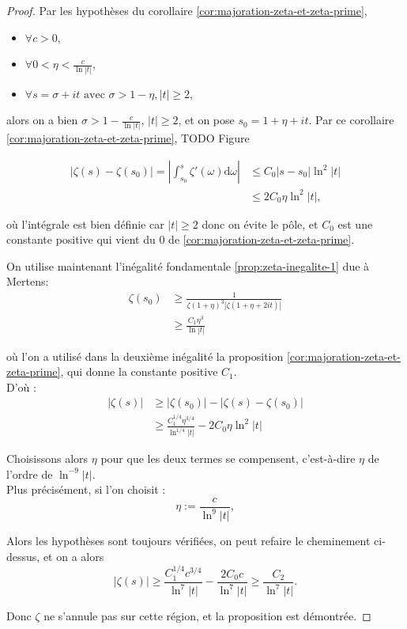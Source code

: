 \documentclass[french]{report}
\begin{document}
\begin{proof}
  Par les hypothèses du corollaire \ref{cor:majoration-zeta-et-zeta-prime},
  \begin{itemize}
    \item $\forall c>0$,
    \item $\forall 0<\eta<\frac{c}{\ln|t|}$,
    \item $\forall s=\sigma+it\,\,\mathrm{avec}\,\,\sigma>1-\eta, |t|\geq2$,
  \end{itemize}
  alors on a bien $\sigma > 1-\frac{c}{\ln|t|}$, $|t|\geq2$, et on pose $s_0=1+\eta+it$. Par ce corollaire \ref{cor:majoration-zeta-et-zeta-prime},
  TODO Figure

  \begin{align*}
    |\zeta(s)-\zeta(s_0)|
    = \left|\int_{s_0}^s\zeta'(\omega)\mathrm{d}\omega\right|
    &\leq C_0|s-s_0|\ln^2|t| \\
    &\leq 2C_0\eta\ln^2|t|,
  \end{align*}
  
  où l'intégrale est bien définie car $|t|\geq2$ donc on évite le pôle, et $C_0$ est une constante positive qui vient du $0$ de \ref{cor:majoration-zeta-et-zeta-prime}.

  On utilise maintenant l'inégalité fondamentale \ref{prop:zeta-inegalite-1} due à Mertens:
  \begin{align*}
    \zeta(s_0)
    &\geq \frac{1}{\zeta(1+\eta)^3|\zeta(1+\eta+2it)|} \\
    &\geq \frac{C_1\eta^3}{\ln|t|}
  \end{align*}

  où l'on a utilisé dans la deuxième inégalité la proposition \ref{cor:majoration-zeta-et-zeta-prime}, qui donne la constante positive $C_1$.
  \\

  D'où :
  \begin{align*}
    |\zeta(s)|
    &\geq |\zeta(s_0)| - |\zeta(s)-\zeta(s_0)| \\
    &\geq \frac{C_1^{1/4}\eta^{3/4}}{\ln^{1/4}|t|} - 2C_0\eta\ln^2|t|
  \end{align*}

  Choisissons alors $\eta$ pour que les deux termes se compensent, c'est-à-dire $\eta$ de l'ordre de $\ln^{-9}|t|$.
  \\

  Plus précisément, si l'on choisit :
  \[ \eta:=\frac{c}{\ln^9|t|}, \]

  Alors les hypothèses sont toujours vérifiées, on peut refaire le cheminement ci-dessus, et on a alors
  \[
    |\zeta(s)|
    \geq\frac{C_1^{1/4}c^{3/4}}{\ln^7|t|}-\frac{2C_0c}{\ln^7|t|}
    \geq\frac{C_2}{\ln^7|t|}.
  \]

  Donc $\zeta$ ne s'annule pas sur cette région, et la proposition est démontrée.
\end{proof}
\end{document}
